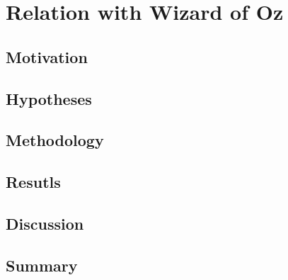 \chapter{Relation with Wizard of Oz}\label{chap:woz}

\section{Motivation}

\section{Hypotheses}

\section{Methodology}

\section{Resutls}

\section{Discussion}

\section{Summary}

